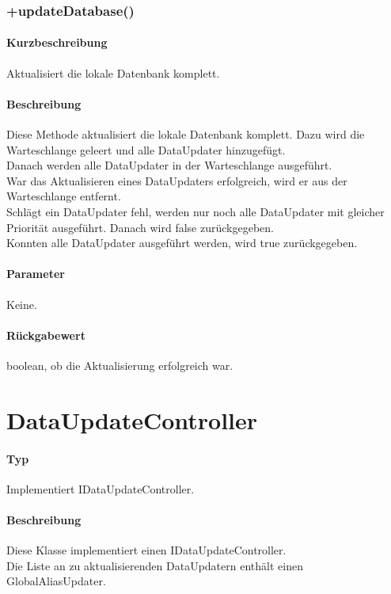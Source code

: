 \subsubsection{+updateDatabase()}%
\paragraph*{Kurzbeschreibung}
Aktualisiert die lokale Datenbank komplett.
\paragraph*{Beschreibung}
Diese Methode aktualisiert die lokale Datenbank komplett. 
Dazu wird die Warteschlange geleert und alle DataUpdater hinzugefügt.\\
Danach werden alle DataUpdater in der Warteschlange ausgeführt.\\
War das Aktualisieren eines DataUpdaters erfolgreich, wird er aus der Warteschlange entfernt.\\
Schlägt ein DataUpdater fehl, werden nur noch alle DataUpdater mit gleicher Priorität 
ausgeführt. Danach wird false zurückgegeben.\\
Konnten alle DataUpdater ausgeführt werden, wird true zurückgegeben.
\paragraph*{Parameter}
Keine.
\paragraph*{Rückgabewert}
boolean, ob die Aktualisierung erfolgreich war.

\section{DataUpdateController}
\paragraph*{Typ}
Implementiert IDataUpdateController.
\paragraph*{Beschreibung}
Diese Klasse implementiert einen IDataUpdateController.\\
Die Liste an zu aktualisierenden DataUpdatern enthält einen GlobalAliasUpdater.